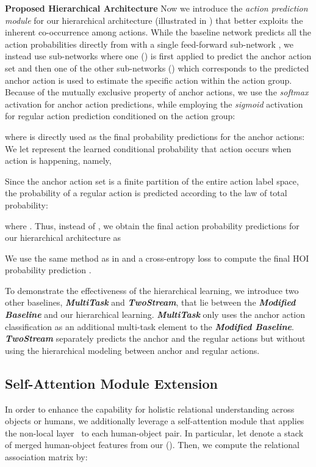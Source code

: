 \noindent\textbf{Proposed Hierarchical Architecture}
Now we introduce the \emph{action prediction module} for our hierarchical architecture (illustrated in ) that better exploits the inherent co-occurrence among actions. While the baseline network predicts all the action probabilities directly from  with a single feed-forward sub-network , we instead use  sub-networks where one () is first applied to predict the anchor action set and then one of the  other sub-networks () which corresponds to the predicted anchor action is used to estimate the specific action within the action group. Because of the mutually exclusive property of anchor actions, we use the \emph{softmax} activation for anchor action predictions, while employing the \emph{sigmoid} activation for regular action prediction conditioned on the action group:




where  is directly used as the final probability predictions for the anchor actions:
We let  represent the learned conditional probability that action  occurs when action  is happening, namely, 

Since the anchor action set is a finite partition of the entire action {label} space, the probability of a regular action  is predicted according to the law of total probability:

where .
Thus, 
instead of ,
we obtain the final action probability predictions for our hierarchical architecture  as 

We use the same method as in  and a cross-entropy loss  to compute the final HOI probability prediction .

To demonstrate the effectiveness of the hierarchical learning, we introduce two other baselines,  \emph{\textbf{MultiTask}} and \emph{\textbf{TwoStream}}, that lie between the \emph{\textbf{Modified Baseline}} and our hierarchical learning. \emph{\textbf{MultiTask}} only uses the anchor action classification as an additional multi-task element to the \emph{\textbf{Modified Baseline}}. \emph{\textbf{TwoStream}} separately predicts the anchor and the regular actions
but without using the hierarchical modeling between anchor and regular actions. 







\subsection{Self-Attention Module Extension}
\label{sec.attention}
In order to enhance the capability for holistic relational understanding across objects or humans, we additionally leverage a self-attention module that applies the non-local layer~\cite{wang2018non} to each human-object pair. In particular, let  denote a stack of  merged human-object features from our  ().
Then, we compute the relational association matrix by:

